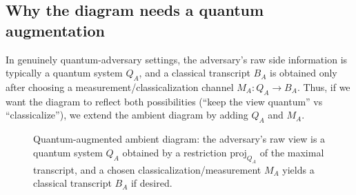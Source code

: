 \documentclass[11pt,a4paper]{article}
\theoremstyle{definition}
\theoremstyle{plain}
\begin{document}
\subsection{Why the diagram needs a quantum augmentation}
In genuinely quantum-adversary settings, the adversary's raw side information is typically a quantum system $Q_A$, and a classical transcript $B_A$ is obtained only after choosing a measurement/classicalization channel $M_A:Q_A\to B_A$.
Thus, if we want the diagram to reflect both possibilities (``keep the view quantum'' vs ``classicalize''), we extend the ambient diagram by adding $Q_A$ and $M_A$.

\begin{figure}[ht]
\centering
{}
\caption{Quantum-augmented ambient diagram: the adversary's raw view is a quantum system $Q_A$ obtained by a restriction $\mathrm{proj}_{Q_A}$ of the maximal transcript, and a chosen classicalization/measurement $M_A$ yields a classical transcript $B_A$ if desired.}
\label{fig:quantum-augmented-ambient}
\end{figure}
\end{document}
